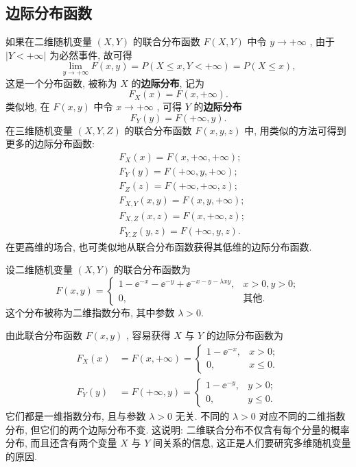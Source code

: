   \subsection{边际分布函数}\label{ssec:3.2.1}
  如果在二维随机变量 $(X,Y)$ 的联合分布函数 $F(X,Y)$ 中令 $y\to+\infty$ , 由于 $|Y<+\infty|$ 为必然事件, 故可得
  \begin{equation*}
  \lim_{y\to+\infty}F(x,y)=P(X\leqslant x,Y<+\infty)=P(X\leqslant x),
  \end{equation*}
  这是一个分布函数, 被称为 $X$ 的\textbf{边际分布}, 记为
  \begin{equation}
  F_{X}(x)=F(x,+\infty).\label{eq:3.2.1}
  \end{equation}
  类似地, 在 $F(x,y)$ 中令 $x\to+\infty$ , 可得 $Y$ 的\textbf{边际分布}
  \begin{equation}
  F_{Y}(y)=F(+\infty,y).\label{eq:3.2.2}
  \end{equation}
  在三维随机变量 $(X,Y,Z)$ 的联合分布函数 $F(x,y,z)$ 中, 用类似的方法可得到更多的边际分布函数:
  \begin{align*}
  &F_{X}(x) = F(x,+\infty,+\infty);\\
  &F_{Y}(y) = F(+\infty,y,+\infty);\\
  &F_{Z}(z) = F(+\infty,+\infty,z);\\
  &F_{X,Y}(x,y) = F(x,y,+\infty);\\
  &F_{X,Z}(x,z) = F(x,+\infty,z);\\
  &F_{Y,Z}(y,z) = F(+\infty,y,z).
  \end{align*}
  在更高维的场合, 也可类似地从联合分布函数获得其低维的边际分布函数.
  \begin{example}\label{exam:3.2.1}
  	设二维随机变量 $(X,Y)$ 的联合分布函数为
  	\begin{equation*}
  	F(x,y)=
  	\begin{cases}
  	1-\ee^{-x}-\ee^{-y}+\ee^{-x-y-\lambda xy}, & x>0,y>0;\\
  	0, & \text{其他}.
  	\end{cases}
  	\end{equation*}
  	这个分布被称为二维指数分布, 其中参数 $\lambda>0$.
  	
  	由此联合分布函数 $F(x,y)$ , 容易获得 $X$ 与 $Y$ 的边际分布函数为
  	\begin{align*}
  	F_{X}(x) &= F(x,+\infty)=
  	\begin{cases}
  	1-\ee^{-x}, & x>0;\\
  	0, & x\leqslant0.
  	\end{cases}\\
  	F_{Y}(y) &= F(+\infty,y)=
  	\begin{cases}
  	1-\ee^{-y}, & y>0;\\
  	0, & y\leqslant0.
  	\end{cases}
  	\end{align*}
  	它们都是一维指数分布, 且与参数 $\lambda>0$ 无关. 不同的 $\lambda>0$ 对应不同的二维指数分布, 但它们的两个边际分布不变. 这说明: 二维联合分布不仅含有每个分量的概率分布, 而且还含有两个变量 $X$ 与 $Y$ 间关系的信息, 这正是人们要研究多维随机变量的原因.
  \end{example}
  

